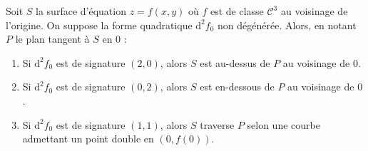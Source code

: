
	\begin{application}
		Soit $S$ la surface d'équation $z = f(x, y)$ où $f$ est de classe $\mathcal{C}^3$ au voisinage de l'origine. On suppose la forme quadratique $\mathrm{d}^2 f_0$ non dégénérée. Alors, en notant $P$ le plan tangent à $S$ en $0$ :
		\begin{enumerate}[label=(\roman*)]
			\item Si $\mathrm{d}^2 f_0$ est de signature $(2, 0)$, alors $S$ est au-dessus de $P$ au voisinage de $0$.
			\item Si $\mathrm{d}^2 f_0$ est de signature $(0, 2)$, alors $S$ est en-dessous de $P$ au voisinage de $0$.
			\item Si $\mathrm{d}^2 f_0$ est de signature $(1, 1)$, alors $S$ traverse $P$ selon une courbe admettant un point double en $(0, f(0))$.
		\end{enumerate}
	\end{application}

